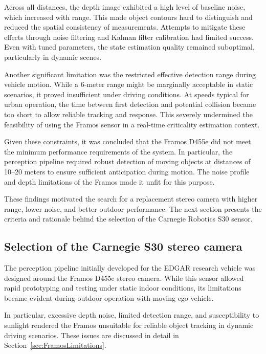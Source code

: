 Across all distances, the depth image exhibited a high level of baseline noise, 
which increased with range. This made object contours hard to distinguish and 
reduced the spatial consistency of measurements. Attempts to mitigate these 
effects through noise filtering and Kalman filter calibration had limited success. 
Even with tuned parameters, the state estimation quality remained suboptimal, 
particularly in dynamic scenes.

Another significant limitation was the restricted effective detection range during 
vehicle motion. While a 6-meter range might be marginally acceptable in static 
scenarios, it proved insufficient under driving conditions. At speeds typical for 
urban operation, the time between first detection and potential collision became 
too short to allow reliable tracking and response. This severely undermined the 
feasibility of using the Framos sensor in a real-time criticality estimation context.

Given these constraints, it was concluded that the Framos D455e did not meet the 
minimum performance requirements of the system. In particular, the perception 
pipeline required robust detection of moving objects at distances of 10--20 meters 
to ensure sufficient anticipation during motion. The noise profile and depth 
limitations of the Framos made it unfit for this purpose.

These findings motivated the search for a replacement stereo camera with higher 
range, lower noise, and better outdoor performance. The next section presents the 
criteria and rationale behind the selection of the Carnegie Robotics S30 sensor.


\subsection{Selection of the Carnegie S30 stereo camera}\label{sec:CarnegieSelection}

The perception pipeline initially developed for the EDGAR research vehicle was 
designed around the Framos D455e stereo camera. While this sensor allowed rapid 
prototyping and testing under static indoor conditions, its limitations became 
evident during outdoor operation with moving ego vehicle. 

In particular, excessive depth noise, limited 
detection range, and susceptibility to sunlight rendered the Framos unsuitable 
for reliable object tracking in dynamic driving scenarios. These issues are 
discussed in detail in Section~\ref{sec:FramosLimitations}.

